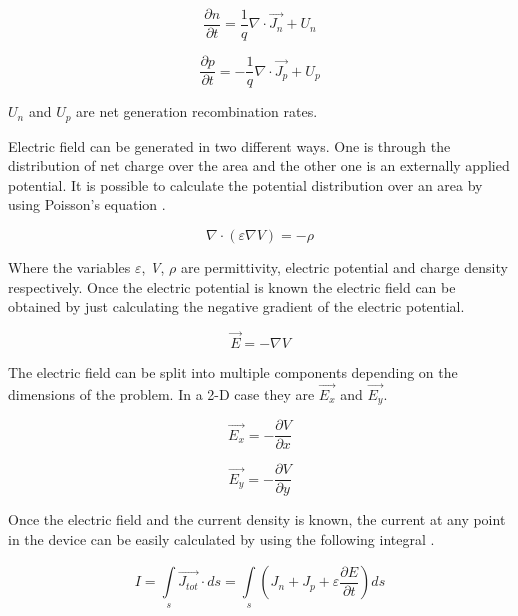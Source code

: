 \begin{doublespace}
\begin{equation}
\frac{\partial n}{\partial t}=\frac{1}{q}\nabla \cdot \vec{J_n}+U_{n}
\label{conn}
\end{equation}

\begin{equation}
\frac{\partial p}{\partial t}=-\frac{1}{q}\nabla \cdot \vec{J_p}+U_{p}
\label{conp}
\end{equation}

$U_{n}$ and $U_{p}$ are net generation recombination rates.  

Electric field can be generated in two different ways. One is through the distribution of net charge over the area and the other one is an externally applied potential. It is possible to calculate the potential distribution over an area by using Poisson's equation \cite{Dragica1}. 

\begin{equation}
\nabla \cdot  (\varepsilon \nabla V)=-\rho
\label{poisson}
\end{equation}

Where the variables \textit{$\varepsilon$}, \textit{V}, \textit{$\rho$} are permittivity, electric potential and charge density respectively. Once the electric potential is known the electric field can be obtained by just calculating the negative gradient of the electric potential. 

\begin{equation}
\vec{E}=-\nabla V
\label{Efield}
\end{equation}

The electric field can be split into multiple components depending on the dimensions of the problem. In a 2-D case they are $\vec{E_x}$ and $\vec{E_y}$.

\begin{equation}
\vec{E_x}=-\frac{\partial V}{\partial x}
\end{equation}

\begin{equation}
\vec{E_y}=-\frac{\partial V}{\partial y}
\end{equation}

Once the electric field and the current density is known, the current at any point in the device can be easily calculated by using the following integral \cite{snowden}.

\begin{equation}
I=\int\limits_{s}^{}\vec{J_{tot}} \cdot ds = \int\limits_{s}^{}(J_n+J_p+\varepsilon\frac{\partial E}{\partial t})ds
\end{equation}


\end{doublespace}
